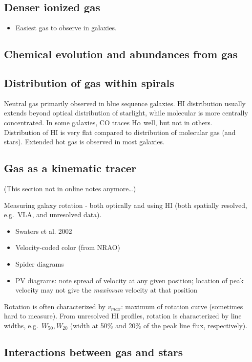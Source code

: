 \documentclass{article}
\newcommand{\mynotes}[1]{\textcolor{cadmiumgreen}{#1}}
\begin{document}
\subsection{Denser ionized gas}
\begin{itemize}
    \item Easiest gas to observe in galaxies.
\end{itemize}
\subsection{Chemical evolution and abundances from gas}
\subsection{Distribution of gas within spirals}
Neutral gas primarily observed in blue sequence galaxies. HI distribution
usually extends beyond optical distribution of starlight, while molecular is
more centrally concentrated. In some galaxies, CO traces H$\alpha$ well, but
not in others. Distribution of HI is very flat compared to distribution of
molecular gas (and stars). Extended hot gas is observed in most galaxies.

\subsection{Gas as a kinematic tracer}
\mynotes{(This section not in online notes anymore\ldots)}

Measuring galaxy rotation - both optically and using HI (both spatially
resolved, e.g.\ VLA, and unresolved data).
\begin{itemize}
    \item Swaters et al. 2002
    \item Velocity-coded color (from NRAO)
    \item Spider diagrams
    \item PV diagrams: note spread of velocity at any given position;
        location of peak velocity may not give the \emph{maximum}
        velocity at that position
\end{itemize}
Rotation is often characterized by $v_{max}$: maximum of rotation curve
(sometimes hard to measure).  From unresolved HI profiles, rotation is
characterized by line widths, e.g.\ $W_{50}, W_{20}$ (width at 50\% and 20\% of
the peak line flux, respectively).


\subsection{Interactions between gas and stars}
\end{document}
